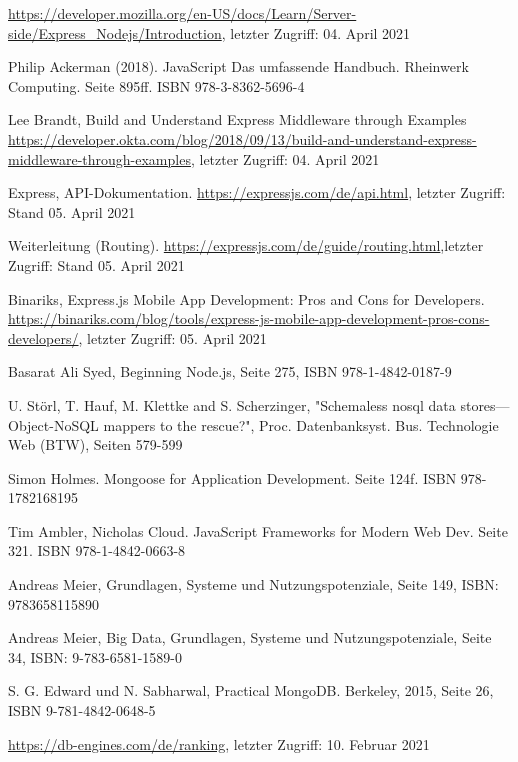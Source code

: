 \documentclass[11pt,a4paper]{article}
\begin{document}
\begin{itemize}
 \url{https://developer.mozilla.org/en-US/docs/Learn/Server-side/Express_Nodejs/Introduction}, letzter Zugriff: 04. April 2021

 Philip Ackerman (2018). JavaScript Das umfassende Handbuch. Rheinwerk Computing. Seite 895ff. ISBN 978-3-8362-5696-4

 Lee Brandt, Build and Understand Express Middleware through Examples \url{https://developer.okta.com/blog/2018/09/13/build-and-understand-express-middleware-through-examples}, letzter Zugriff: 04. April 2021

 Express, API-Dokumentation. \url{https://expressjs.com/de/api.html}, letzter Zugriff: Stand 05. April 2021

 Weiterleitung (Routing). \url{https://expressjs.com/de/guide/routing.html},letzter Zugriff: Stand 05. April 2021

 Binariks, Express.js Mobile App Development: Pros and Cons for Developers. \url{https://binariks.com/blog/tools/express-js-mobile-app-development-pros-cons-developers/}, letzter Zugriff: 05. April 2021

 Basarat Ali Syed, Beginning Node.js, Seite 275, ISBN 978-1-4842-0187-9

 U. Störl, T. Hauf, M. Klettke and S. Scherzinger, "Schemaless nosql data stores—Object-NoSQL mappers to the rescue?", Proc. Datenbanksyst. Bus. Technologie Web (BTW), Seiten 579-599


 Simon Holmes. Mongoose for Application Development. Seite 124f. ISBN 978-1782168195

 Tim Ambler, Nicholas Cloud. JavaScript Frameworks for Modern Web Dev. Seite 321. ISBN 978-1-4842-0663-8


%
%
%
%

 Andreas Meier, Grundlagen, Systeme und Nutzungspotenziale, Seite 149, ISBN: 9783658115890

 Andreas Meier, Big Data, Grundlagen, Systeme und Nutzungspotenziale, Seite 34, ISBN: 9-783-6581-1589-0

 S. G. Edward und N. Sabharwal, Practical MongoDB. Berkeley, 2015, Seite 26, ISBN 9-781-4842-0648-5

 \url{https://db-engines.com/de/ranking}, letzter Zugriff: 10. Februar 2021


\end{itemize}
\end{document}
